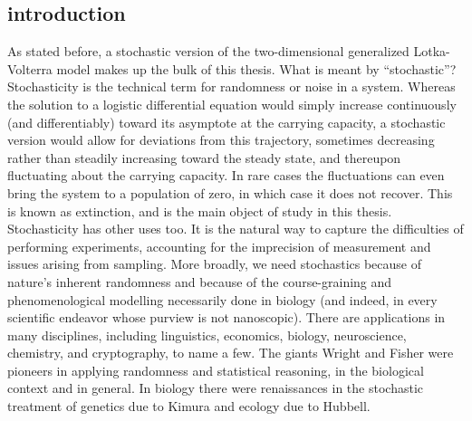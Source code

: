 \documentclass[a4paper,11pt]{article}
\numberwithin{equation}{section} %
\begin{document}
\subsection{introduction}
As stated before, a stochastic version of the two-dimensional generalized Lotka-Volterra model makes up the bulk of this thesis. 
What is meant by ``stochastic''? 
Stochasticity is the technical term for randomness or noise in a system. 
Whereas the solution to a logistic differential equation would simply increase continuously (and differentiably) toward its asymptote at the carrying capacity, a stochastic version would allow for deviations from this trajectory, sometimes decreasing rather than steadily increasing toward the steady state, and thereupon fluctuating about the carrying capacity. 
In rare cases the fluctuations can even bring the system to a population of zero, in which case it does not recover. 
This is known as extinction, and is the main object of study in this thesis. 
Stochasticity has other uses too. 
It is the natural way to capture the difficulties of performing experiments, accounting for the imprecision of measurement and issues arising from sampling. 
More broadly, we need stochastics because of nature's inherent randomness and because of the course-graining and phenomenological modelling necessarily done in biology (and indeed, in every scientific endeavor whose purview is not nanoscopic). %
There are applications in many disciplines, including linguistics, economics, biology, neuroscience, chemistry, and cryptography, to name a few. 
The giants Wright and Fisher were pioneers in applying randomness and statistical reasoning, in the biological context and in general. 
In biology there were renaissances in the stochastic treatment of genetics due to Kimura and ecology due to Hubbell. 
\end{document}
